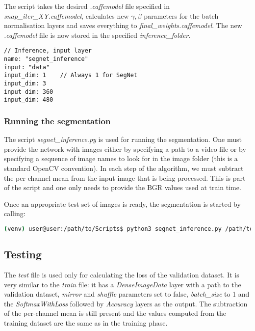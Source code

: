 The script takes the desired \textit{.caffemodel} file specified in \textit{snap\_iter\_XY.caffemodel}, calculates new $ \gamma, \beta $ parameters for the batch normalisation layers and saves everything to \textit{final\_weights.caffemodel}. The new \textit{.caffemodel} file is now stored in the specified \textit{inference\_folder}. \cite{issue}

\begin{lstlisting}[caption={Replacing input layer type in \textit{inference.prototxt} \cite{filip_github}},captionpos=b]
// Inference, input layer
name: "segnet_inference"
input: "data"
input_dim: 1	// Always 1 for SegNet
input_dim: 3
input_dim: 360
input_dim: 480
\end{lstlisting}

\subsubsection{Running the segmentation}

The script \textit{segnet\_inference.py} is used for running the segmentation. One must provide the network with images either by specifying a path to a video file or by specifying a sequence of image names to look for in the image folder (this is a standard OpenCV convention). In each step of the algorithm, we must subtract the per-channel mean from the input image that is being processed. This is part of the script and one only needs to provide the BGR values used at train time.

Once an appropriate test set of images is ready, the segmentation is started by calling:

\begin{lstlisting}[language=bash]
(venv) user@user:/path/to/Scripts$ python3 segnet_inference.py /path/to/inference.prototxt /path/to/final_weights.caffemodel /path/to/videofile.avi 
\end{lstlisting}

\subsection{Testing}

The \textit{test} file is used only for calculating the loss of the validation dataset. It is very similar to the \textit{train} file: it has a \textit{DenseImageData} layer with a path to the validation dataset, \textit{mirror} and \textit{shuffle} parameters set to false, \textit{batch\_size} to 1 and the \textit{SoftmaxWithLoss} followed by \textit{Accuracy} layers as the output. The subtraction of the per-channel mean is still present and the values computed from the training dataset are the same as in the training phase. 

